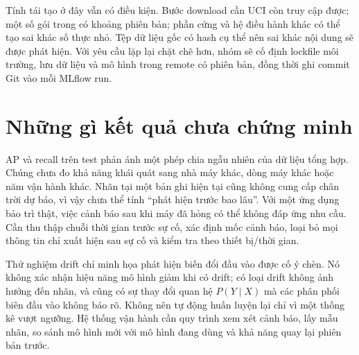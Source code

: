 Tính tái tạo ở đây vẫn có điều kiện. Bước download cần UCI còn truy cập được; một số gói trong  có khoảng phiên bản; phần cứng và hệ điều hành khác có thể tạo sai khác số thực nhỏ. Tệp dữ liệu gốc có hash cụ thể nên sai khác nội dung sẽ được phát hiện. Với yêu cầu lặp lại chặt chẽ hơn, nhóm sẽ cố định lockfile môi trường, lưu dữ liệu và mô hình trong remote có phiên bản, đồng thời ghi commit Git vào mỗi MLflow run.

\section{Những gì kết quả chưa chứng minh}
AP và recall trên test phản ánh một phép chia ngẫu nhiên của dữ liệu tổng hợp. Chúng chưa đo khả năng khái quát sang nhà máy khác, dòng máy khác hoặc năm vận hành khác. Nhãn tại một bản ghi hiện tại cũng không cung cấp chân trời dự báo, vì vậy chưa thể tính ``phát hiện trước bao lâu''. Với một ứng dụng bảo trì thật, việc cảnh báo sau khi máy đã hỏng có thể không đáp ứng nhu cầu. Cần thu thập chuỗi thời gian trước sự cố, xác định mốc cảnh báo, loại bỏ mọi thông tin chỉ xuất hiện sau sự cố và kiểm tra theo thiết bị/thời gian.

Thử nghiệm drift chỉ minh họa phát hiện biến đổi đầu vào được cố ý chèn. Nó không xác nhận hiệu năng mô hình giảm khi có drift; có loại drift không ảnh hưởng đến nhãn, và cũng có sự thay đổi quan hệ $P(Y\mid X)$ mà các phân phối biên đầu vào không báo rõ. Không nên tự động huấn luyện lại chỉ vì một thống kê vượt ngưỡng. Hệ thống vận hành cần quy trình xem xét cảnh báo, lấy mẫu nhãn, so sánh mô hình mới với mô hình đang dùng và khả năng quay lại phiên bản trước.

